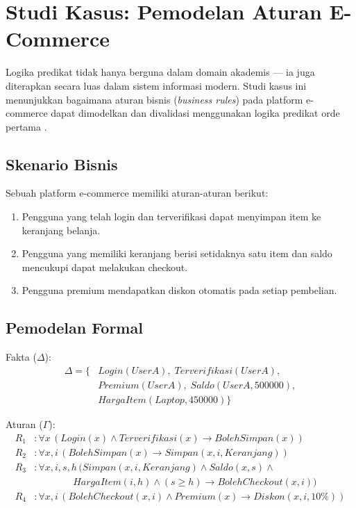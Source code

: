 \section{Studi Kasus: Pemodelan Aturan E-Commerce}

Logika predikat tidak hanya berguna dalam domain akademis --- ia juga diterapkan secara luas dalam sistem informasi modern. Studi kasus ini menunjukkan bagaimana aturan bisnis (\textit{business rules}) pada platform e-commerce dapat dimodelkan dan divalidasi menggunakan logika predikat orde pertama \cite{rosen2019}.

\subsection{Skenario Bisnis}

Sebuah platform e-commerce memiliki aturan-aturan berikut:
\begin{enumerate}
    \item Pengguna yang telah login dan terverifikasi dapat menyimpan item ke keranjang belanja.
    \item Pengguna yang memiliki keranjang berisi setidaknya satu item dan saldo mencukupi dapat melakukan checkout.
    \item Pengguna premium mendapatkan diskon otomatis pada setiap pembelian.
\end{enumerate}

\subsection{Pemodelan Formal}

Fakta ($\Delta$):
\begin{align*}
\Delta = \{ & Login(UserA), \; Terverifikasi(UserA), \\
            & Premium(UserA), \; Saldo(UserA, 500000), \\
            & HargaItem(Laptop, 450000) \}
\end{align*}

Aturan ($\Gamma$):
\begin{align*}
R_1&: \forall x\, (Login(x) \wedge Terverifikasi(x) \rightarrow BolehSimpan(x)) \\
R_2&: \forall x, i\, (BolehSimpan(x) \rightarrow Simpan(x, i, Keranjang)) \\
R_3&: \forall x, i, s, h\, (Simpan(x, i, Keranjang) \wedge Saldo(x, s) \wedge \\
    & \qquad\qquad HargaItem(i, h) \wedge (s \geq h) \rightarrow BolehCheckout(x, i)) \\
R_4&: \forall x, i\, (BolehCheckout(x, i) \wedge Premium(x) \rightarrow Diskon(x, i, 10\%))
\end{align*}

